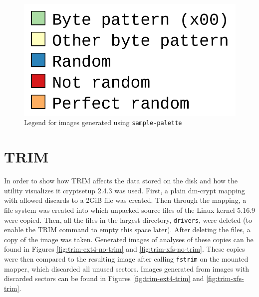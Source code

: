 \documentclass[
  digital, %
  color,   %
  oneside, %
  lof,     %
  nolot,     %
]{fithesis4}
\begin{document}

\begin{figure}[H]
  \includegraphics[width=.45\textwidth,interpolate=true]{legend.png}
  \caption{Legend for images generated using \texttt{sample-palette}}
  \label{fig:legend}
\end{figure}

\section{TRIM}
\label{sec:trim}

In order to show how TRIM affects the data stored on the disk and how the utility visualizes it cryptsetup 2.4.3 was used. 
First, a plain dm-crypt mapping with allowed discards to a 2GiB file was created.
Then through the mapping, a file system was created into which unpacked source files of the Linux kernel 5.16.9 were copied.
Then, all the files in the largest directory, \texttt{drivers}, were deleted (to enable the TRIM command to empty this space later).
After deleting the files, a copy of the image was taken.
Generated images of analyses of these copies can be found in Figures \ref{fig:trim-ext4-no-trim} and \ref{fig:trim-xfs-no-trim}.
These copies were then compared to the resulting image after calling \texttt{fstrim} on the mounted mapper, which discarded all unused sectors.
Images generated from images with discarded sectors can be found in Figures \ref{fig:trim-ext4-trim} and \ref{fig:trim-xfs-trim}.
\end{document}
